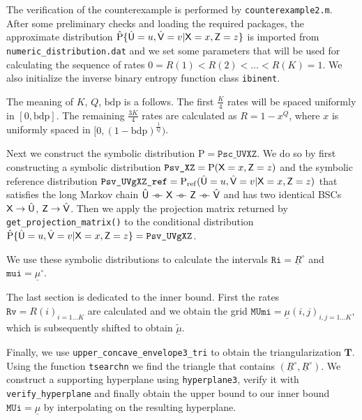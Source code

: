 \documentclass[a4paper,12pt]{scrartcl}
\newcommand{\hPcond}[2]{\ensuremath{\hat{\mathrm{P}}\{#1|#2\}}}
\newcommand{\Prob}{\ensuremath{\mathrm{P}}}
\newcommand{\ul}[1]{\ensuremath{\underline{#1}}}
\newcommand{\wt}[1]{\ensuremath{\widetilde{#1}}}
\newcommand{\mat}[1]{\ensuremath{\mathbf{#1}}}
\newcommand{\rv}[1]{\ensuremath{\mathsf{\uppercase{#1}}}}
\newcommand{\hrv}[1]{\ensuremath{\hat{\rv{#1}}}}
\def\barcirc{\mathrel{\barcirci}}
\def\barcirci{{%
    \setbox0\hbox{\ensuremath{\relbar\!\!\relbar}}%
    \rlap{\hbox to \wd0{\hss\ensuremath{\circ}\hss}}\box0
}}
\newcommand{\mkv}{\ensuremath{\barcirc}}
\begin{document}
The verification of the counterexample is performed by \texttt{counterexample2.m}. After some preliminary checks and loading the required packages, the approximate distribution $\hPcond{\hrv u=u, \hrv v=v}{\rv x=x, \rv z=z}$ is imported from \texttt{numeric\_distribution.dat} and we set some parameters that will be used for calculating the sequence of rates $0 = R(1) < R(2) < \dots < R(K) = 1$. We also initialize the inverse binary entropy function class \texttt{ibinent}.



The meaning of $K$, $Q$, $\mathrm{bdp}$ is a follows. The first $\frac K4$ rates will be spaced uniformly in $[0, \mathrm{bdp}]$. The remaining $\frac{3K}{4}$ rates are calculated as $R=1-x^Q$, where $x$ is uniformly spaced in $[0, (1-\mathrm{bdp})^{\frac 1Q})$.

Next we construct the symbolic distribution $\mathrm{P} = \texttt{Psc\_UVXZ}$. We do so by first constructing a symbolic distribution $\texttt{Psv\_XZ} = \Prob(\rv x=x, \rv z=z)$ and the symbolic reference distribution $\texttt{Psv\_UVgXZ\_ref} = \mathrm{P}_{\mathrm{ref}}(\hrv u=u, \hrv v=v|\rv x=x, \rv z=z)$ that satisfies the long Markov chain $\hrv u \mkv \rv x \mkv \rv z \mkv \hrv v$ and has two identical BSCs $\rv x \to \hrv u$, $\rv z \to \hrv v$.
Then we apply the projection matrix returned by \texttt{get\_projection\_matrix()} to the conditional distribution $\hPcond{\hrv u=u, \hrv v=v}{\rv x=x, \rv z=z} = \texttt{Psv\_UVgXZ}$.



We use these symbolic distributions to calculate the intervals $\texttt{Ri} = \ul R^\circ$ and $\texttt{mui} = \ul \mu^\circ$.



The last section is dedicated to the inner bound. First the rates $\texttt{Rv} = R(i)_{i=1\dots K}$ are calculated and we obtain the grid $\texttt{MUmi} = \ul\mu(i,j)_{i,j=1\dots K}$, which is subsequently shifted to obtain $\ul{\wt{\mu}}$.



Finally, we use \texttt{upper\_concave\_envelope3\_tri} to obtain the triangularization $\mat T$. Using the function \texttt{tsearchn} we find the triangle that contains $(\ul R^\circ, \ul R^\circ)$. We construct a supporting hyperplane using \texttt{hyperplane3}, verify it with \texttt{verify\_hyperplane} and finally obtain the upper bound to our inner bound $\texttt{MUi} = \ul \mu$ by interpolating on the resulting hyperplane.
\end{document}
